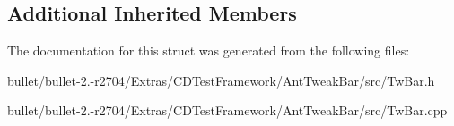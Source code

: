 \subsection*{Additional Inherited Members}


The documentation for this struct was generated from the following files\+:\begin{DoxyCompactItemize}
\item 
bullet/bullet-\/2.-\/r2704/\+Extras/\+C\+D\+Test\+Framework/\+Ant\+Tweak\+Bar/src/Tw\+Bar.\+h\item 
bullet/bullet-\/2.-\/r2704/\+Extras/\+C\+D\+Test\+Framework/\+Ant\+Tweak\+Bar/src/Tw\+Bar.\+cpp\end{DoxyCompactItemize}
